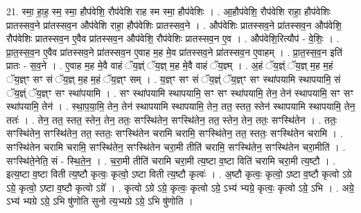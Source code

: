 \documentclass[17pt]{extarticle}
\begin{document}
21. स्मा॒ हा॒ह॒ स्म॒ स्मा॒ हौप॑वेशि॒ रौप॑वेशि राह स्म स्मा॒ हौप॑वेशिः । . आ॒हौप॑वेशि॒ रौप॑वेशि राहा॒ हौप॑वेशिः प्रातस्सव॒ने प्रा॑तस्सव॒न औप॑वेशि राहा॒ हौप॑वेशिः प्रातस्सव॒ने । . औप॑वेशिः प्रातस्सव॒ने प्रा॑तस्सव॒न औप॑वेशि॒ रौप॑वेशिः प्रातस्सव॒न ए॒वैव प्रा॑तस्सव॒न औप॑वेशि॒ रौप॑वेशिः प्रातस्सव॒न ए॒व । . औप॑वेशि॒रित्यौप॑ - वे॒शिः॒ । . प्रा॒त॒स्स॒व॒न ए॒वैव प्रा॑तस्सव॒ने प्रा॑तस्सव॒न ए॒वाह म॒ह मे॒व प्रा॑तस्सव॒ने प्रा॑तस्सव॒न ए॒वाहम् । . प्रा॒त॒स्स॒व॒न इति॑ प्रातः - स॒व॒ने । . ए॒वाह म॒ह मे॒वै वाहं ॅय॒ज्ञ्ं ॅय॒ज्ञ् म॒ह मे॒वै वाहं ॅय॒ज्ञ्म् । . अ॒हं ॅय॒ज्ञ्ं ॅय॒ज्ञ् म॒ह म॒हं ॅय॒ज्ञ्ꣳ सꣳ सं ॅय॒ज्ञ् म॒ह म॒हं ॅय॒ज्ञ्ꣳ सम् । . य॒ज्ञ्ꣳ सꣳ सं ॅय॒ज्ञ्ं ॅय॒ज्ञ्ꣳ सꣳ स्था॑पयामि स्थापयामि॒ सं ॅय॒ज्ञ्ं ॅय॒ज्ञ्ꣳ सꣳ स्था॑पयामि । . सꣳ स्था॑पयामि स्थापयामि॒ सꣳ सꣳ स्था॑पयामि॒ तेन॒ तेन॑ स्थापयामि॒ सꣳ सꣳ स्था॑पयामि॒ तेन॑ । . स्था॒प॒या॒मि॒ तेन॒ तेन॑ स्थापयामि स्थापयामि॒ तेन॒ तत॒ स्तत॒ स्तेन॑ स्थापयामि स्थापयामि॒ तेन॒ ततः॑ । . तेन॒ तत॒ स्तत॒ स्तेन॒ तेन॒ ततः॒ सꣳस्थि॑तेन॒ सꣳस्थि॑तेन॒ तत॒ स्तेन॒ तेन॒ ततः॒ सꣳस्थि॑तेन । . ततः॒ सꣳस्थि॑तेन॒ सꣳस्थि॑तेन॒ तत॒ स्ततः॒ सꣳस्थि॑तेन चरामि चरामि॒ सꣳस्थि॑तेन॒ तत॒ स्ततः॒ सꣳस्थि॑तेन चरामि । . सꣳस्थि॑तेन चरामि चरामि॒ सꣳस्थि॑तेन॒ सꣳस्थि॑तेन चरा॒मी तीति॑ चरामि॒ सꣳस्थि॑तेन॒ सꣳस्थि॑तेन चरा॒मीति॑ । . सꣳस्थि॑ते॒नेति॒ सं - स्थि॒ते॒न॒ । . च॒रा॒मी तीति॑ चरामि चरा॒मी त्य॒ष्टा व॒ष्टा विति॑ चरामि चरा॒मी त्य॒ष्टौ । . इत्य॒ष्टा व॒ष्टा विती त्य॒ष्टौ कृत्वः॒ कृत्वो॒ ऽष्टा विती त्य॒ष्टौ कृत्वः॑ । . अ॒ष्टौ कृत्वः॒ कृत्वो॒ ऽष्टा व॒ष्टौ कृत्वो ऽग्रे ऽग्रे॒ कृत्वो॒ ऽष्टा व॒ष्टौ कृत्वो ऽग्रे᳚ । . कृत्वो ऽग्रे ऽग्रे॒ कृत्वः॒ कृत्वो ऽग्रे॒ ऽभ्य॑ भ्यग्रे॒ कृत्वः॒ कृत्वो ऽग्रे॒ ऽभि । . अग्रे॒ ऽभ्य॑ भ्यग्रे ऽग्रे॒ ऽभि षु॑णोति सुनो त्य॒भ्यग्रे ऽग्रे॒ ऽभि षु॑णोति । \newline
\end{document}
